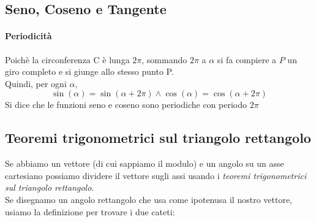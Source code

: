 \documentclass[12pt, a4paper, openany]{book}
\begin{document}
\subsection*{Seno, Coseno e Tangente}
\paragraph*{Periodicità}
Poichè la circonferenza C è lunga $2\pi$, sommando $2\pi$ a $\alpha$ si fa compiere a $P$
un giro completo e si giunge allo stesso punto P. 
\\Quindi, per ogni $\alpha$,
\[\sin(\alpha) = \sin(\alpha + 2\pi) \wedge \cos(\alpha) = \cos(\alpha+2\pi)\]
Si dice che le funzioni seno e coseno sono periodiche con periodo $2\pi$

\subsection*{Teoremi trigonometrici sul triangolo rettangolo}
Se abbiamo un vettore (di cui sappiamo il modulo) e un angolo su un asse cartesiano possiamo dividere il vettore sugli assi usando i
\emph{teoremi trigonometrici sul triangolo rettangolo}.
\\Se disegnamo un angolo rettangolo che usa come ipotenusa il nostro vettore, usiamo la definizione per trovare i due cateti:
\end{document}
